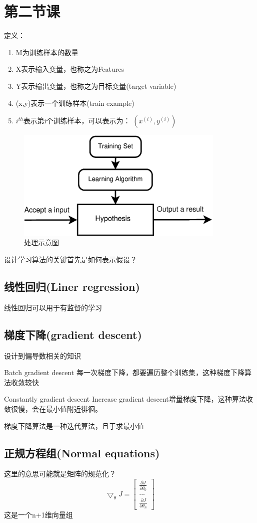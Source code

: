 \documentclass[a4paper,12pt]{ctexart}
\begin{document}
\section{第二节课}
定义：
\begin{enumerate}
  \item M为训练样本的数量
  \item X表示输入变量，也称之为Features
  \item Y表示输出变量，也称之为目标变量(target variable)
  \item (x,y)表示一个训练样本(train example)
  \item $i^{th}$表示第i个训练样本，可以表示为： $(x^{(i)},y^{(i)})$
\end{enumerate}
\begin{figure}
  \centering
  \includegraphics[width=10cm]{figure/ML_process.eps}
  \caption{处理示意图}\label{ML_process}
\end{figure}



设计学习算法的关键首先是如何表示假设？


\subsection{线性回归(Liner regression)}


线性回归可以用于有监督的学习


\subsection{梯度下降(gradient descent)}
设计到偏导数相关的知识

Batch gradient descent 每一次梯度下降，都要遍历整个训练集，这种梯度下降算法收敛较快

Constantly gradient descent
Increase gradient descent增量梯度下降，这种算法收敛很慢，会在最小值附近徘徊。

梯度下降算法是一种迭代算法，且于求最小值

\subsection{正规方程组(Normal equations)}
这里的意思可能就是矩阵的规范化？
\begin{equation}
\bigtriangledown_{\theta}J=
{
    \left[
        \begin{array}{ccc}
            \frac{\partial J}{\partial \theta_0}\\
            ...\\
            \frac{\partial J}{\partial \theta_n}
        \end{array}
    \right ]
}
\end{equation}
这是一个n+1维向量组
\end{document}
